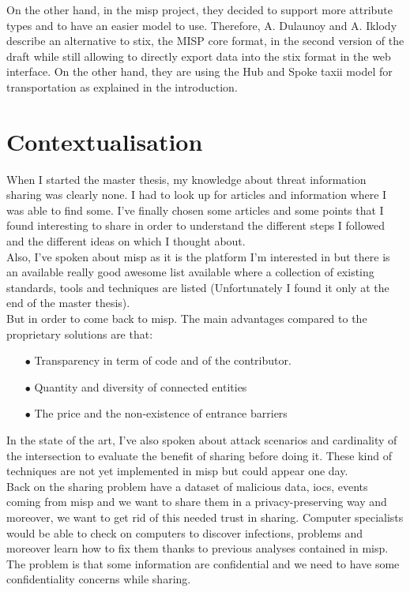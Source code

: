 \documentclass{eplmastersthesis}
\begin{document}
On the other hand, in the \gls{misp} project, they decided to support more attribute types and to have an easier model to use. Therefore, A. Dulaunoy and A. Iklody describe an alternative to \gls{stix}, the MISP core format, in the second version of the draft\cite{MispDraft} while still allowing to directly export data into the \gls{stix} format in the web interface. On the other hand, they are using the Hub and Spoke \gls{taxii} model for transportation as explained in the introduction.

\section{Contextualisation}
When I started the master thesis, my knowledge about threat information sharing was clearly none. I had to look up for articles and information where I was able to find some. I've finally chosen some articles and some points that I found interesting to share in order to understand the different steps I followed and the different ideas on which I thought about.\\
Also, I've spoken about \gls{misp} as it is the platform I'm interested in but there is an available really good awesome list \cite{AwesomeTreat} available where a collection of existing standards, tools and techniques are listed (Unfortunately I found it only at the end of the master thesis).\\
But in order to come back to \gls{misp}. The main advantages compared to the proprietary solutions are that:
\begin{itemize}
\item[$\bullet$] Transparency in term of code and of the contributor.
\item[$\bullet$] Quantity and diversity of connected entities
\item[$\bullet$] The price and the non-existence of entrance barriers
\end{itemize}

In the state of the art, I've also spoken about attack scenarios and cardinality of the intersection to evaluate the benefit of sharing before doing it. These kind of techniques are not yet implemented in \gls{misp} but could appear one day.\\

Back on the sharing problem have a dataset of malicious data, \gls{ioc}s, events coming from \gls{misp} and we want to share them in a privacy-preserving way and moreover, we want to get rid of this needed trust in sharing.
Computer specialists would be able to check on computers to discover infections, problems and moreover learn how to fix them thanks to previous analyses contained in \gls{misp}. The problem is that some information are confidential and we need to have some confidentiality concerns while sharing. \\
\end{document}

